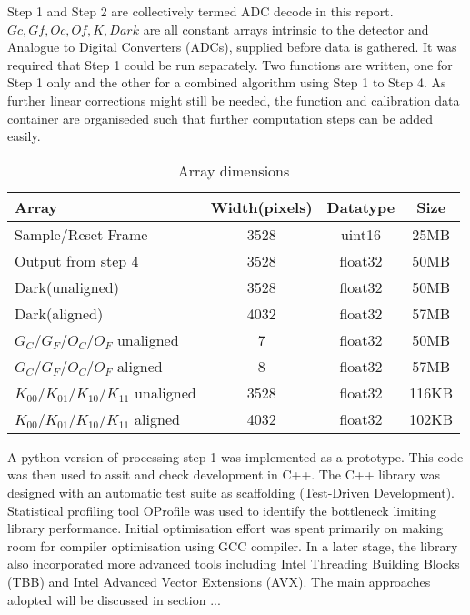 \documentclass[journal]{IEEEtran}
\begin{document}
Step 1 and Step 2 are collectively termed ADC decode in this report. $Gc, Gf, Oc, Of, K, Dark$ are all constant arrays intrinsic to the detector and Analogue to Digital Converters (ADCs), supplied before data is gathered. It was required that Step 1 could be run separately. Two functions are written, one for Step 1 only and the other for a combined algorithm using Step 1 to Step 4. As further linear corrections might still be needed, the function and calibration data container are organiseded such that further computation steps can be added easily.\\

\begin{table}[h]

\label{array_dims}
\centering
\begin{tabular}{l c c c}
\hline
Array 							& Width(pixels)	 & Datatype  &Size\\
\hline\hline
Sample/Reset Frame       				& 3528 		& uint16     &25MB\\
\hline
Output from step 4					& 3528		& float32    &50MB\\
\hline
Dark(unaligned)					 	& 3528		& float32     &50MB\\
\hline
Dark(aligned)				 		& 4032 		& float32     &57MB\\
\hline
$G_C/G_F/O_C/O_F$ unaligned 				& 7   		 & float32    &50MB\\
\hline
$G_C/G_F/O_C/O_F$ aligned 				& 8    		& float32     &57MB\\
\hline
$K_{00}/K_{01}/K_{10}/K_{11}$ unaligned 	& 3528 & float32     & 116KB\\
\hline
$K_{00}/K_{01}/K_{10}/K_{11}$ aligned 		& 4032 & float32     & 102KB\\
\hline

\end{tabular}
\caption{Array dimensions}
\end{table}

A python version of processing step 1 was implemented as a prototype. This code was then used to assit and check development in C++. The C++ library was designed with an automatic test suite as scaffolding (Test-Driven Development). Statistical profiling tool OProfile was used to identify the bottleneck limiting library performance. Initial optimisation effort was spent primarily on making room for compiler optimisation using GCC compiler. In a later stage, the library also incorporated more advanced tools including Intel Threading Building Blocks (TBB) and Intel Advanced Vector Extensions (AVX). The main approaches adopted will be discussed in section ...
\end{document}

